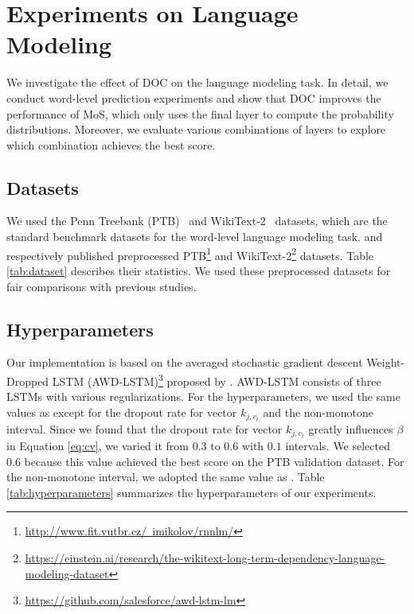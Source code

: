 \documentclass[11pt,a4paper]{article}
\begin{document}
\section{Experiments on Language Modeling}
\label{sec:lm_exp}
We investigate the effect of DOC on the language modeling task.
In detail, we conduct word-level prediction experiments and show that DOC improves the performance of MoS, which only uses the final layer to compute the probability distributions.
Moreover, we evaluate various combinations of layers to explore which combination achieves the best score.



\subsection{Datasets}
We used the Penn Treebank (PTB)~\cite{Marcus:1993:BLA:972470.972475} and WikiText-2~\cite{DBLP:journals/corr/MerityXBS16} datasets, which are the standard benchmark datasets for the word-level language modeling task.
 and  respectively published preprocessed PTB\footnote{\href{http://www.fit.vutbr.cz/~imikolov/rnnlm/}{{http://www.fit.vutbr.cz/~imikolov/rnnlm/}}} and WikiText-2\footnote{\href{https://einstein.ai/research/the-wikitext-long-term-dependency-language-modeling-dataset}{{https://einstein.ai/research/the-wikitext-long-term-dependency-language-modeling-dataset}}} datasets.
Table \ref{tab:dataset} describes their statistics.
We used these preprocessed datasets for fair comparisons with previous studies.


\subsection{Hyperparameters}
Our implementation is based on the averaged stochastic gradient descent Weight-Dropped LSTM (AWD-LSTM)\footnote{\href{https://github.com/salesforce/awd-lstm-lm}{https://github.com/salesforce/awd-lstm-lm}} proposed by .
AWD-LSTM consists of three LSTMs with various regularizations.
For the hyperparameters, we used the same values as  except for the dropout rate for vector $k_{j, c_t}$ and the non-monotone interval.
Since we found that the dropout rate for vector $k_{j, c_t}$ greatly influences $\beta$ in Equation \ref{eq:cv}, we varied it from $0.3$ to $0.6$ with $0.1$ intervals.
We selected $0.6$ because this value achieved the best score on the PTB validation dataset.
For the non-monotone interval, we adopted the same value as .
Table \ref{tab:hyperparameters} summarizes the hyperparameters of our experiments.
\end{document}
